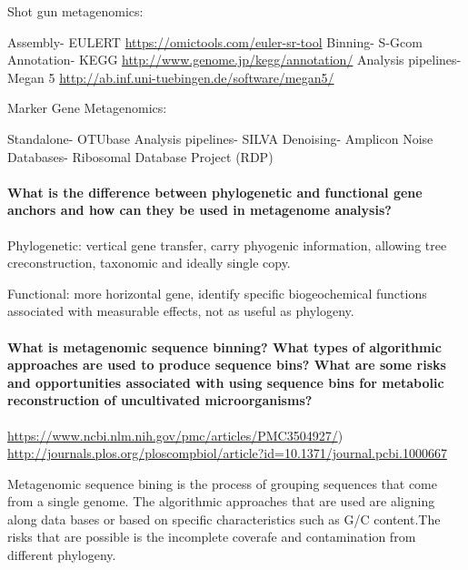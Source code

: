 \documentclass[]{article}
\let\oldparagraph\paragraph
\renewcommand{\paragraph}[1]{\oldparagraph{#1}\mbox{}}
\begin{document}
Shot gun metagenomics:

Assembly- EULERT \url{https://omictools.com/euler-sr-tool} Binning-
S-Gcom Annotation- KEGG \url{http://www.genome.jp/kegg/annotation/}
Analysis pipelines- Megan 5
\url{http://ab.inf.uni-tuebingen.de/software/megan5/}

Marker Gene Metagenomics:

Standalone- OTUbase Analysis pipelines- SILVA Denoising- Amplicon Noise
Databases- Ribosomal Database Project (RDP)

\paragraph{What is the difference between phylogenetic and functional
gene anchors and how can they be used in metagenome
analysis?}\label{what-is-the-difference-between-phylogenetic-and-functional-gene-anchors-and-how-can-they-be-used-in-metagenome-analysis}

Phylogenetic: vertical gene transfer, carry phyogenic information,
allowing tree creconstruction, taxonomic and ideally single copy.

Functional: more horizontal gene, identify specific biogeochemical
functions associated with measurable effects, not as useful as
phylogeny.

\paragraph{What is metagenomic sequence binning? What types of
algorithmic approaches are used to produce sequence bins? What are some
risks and opportunities associated with using sequence bins for
metabolic reconstruction of uncultivated
microorganisms?}\label{what-is-metagenomic-sequence-binning-what-types-of-algorithmic-approaches-are-used-to-produce-sequence-bins-what-are-some-risks-and-opportunities-associated-with-using-sequence-bins-for-metabolic-reconstruction-of-uncultivated-microorganisms}

\url{https://www.ncbi.nlm.nih.gov/pmc/articles/PMC3504927/})
\url{http://journals.plos.org/ploscompbiol/article?id=10.1371/journal.pcbi.1000667}

Metagenomic sequence bining is the process of grouping sequences that
come from a single genome. The algorithmic approaches that are used are
aligning along data bases or based on specific characteristics such as
G/C content.The risks that are possible is the incomplete coverafe and
contamination from different phylogeny.
\end{document}
